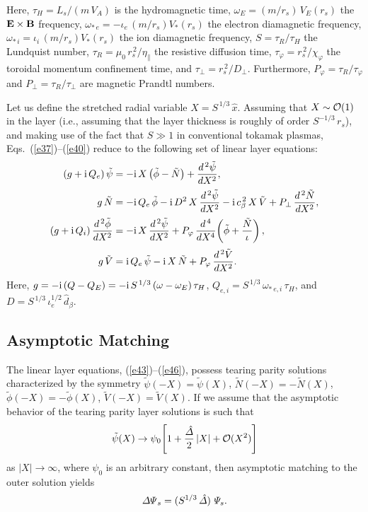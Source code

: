 \documentclass[12pt,prb,aps]{revtex4-1}
\begin{document}
Here, 
$\tau_H = L_s/(m\,V_A)$ 
is the  hydromagnetic time, 
$\omega_E =(m/r_s)\,V_E(r_s)$
  the 
 ${\bf E}\times {\bf B}$ frequency, 
$\omega_{\ast\,e} = -\iota_e\,(m/r_s)V_\ast(r_s)$
the 
   electron diamagnetic
frequency,
$\omega_{\ast\,i} =\iota_i\,(m/r_s)V_\ast(r_s)$
 the  ion diamagnetic
frequency, 
$S=\tau_R/\tau_H$
 the  Lundquist number, 
$\tau_R = \mu_0\,r_s^{\,2}/\eta_\parallel$
 the
 resistive diffusion time, 
$\tau_\varphi
= r_s^{\,2}/\chi_\varphi$
the  toroidal momentum confinement time, and 
$\tau_\perp = r_s^{\,2}/D_\perp$.
  Furthermore, $P_\varphi = \tau_R/\tau_\varphi$ and $P_\perp = \tau_R/\tau_\perp$ are magnetic Prandtl numbers.

 Let us define the stretched radial variable $X = S^{\,1/3}\,\hat{x}$.
Assuming that $X\sim{\cal O}(1)$ in the layer (i.e., assuming that the layer thickness is roughly of order $S^{-1/3}\,r_s$),
and making use of the fact that $S\gg 1$ in conventional tokamak plasmas,  Eqs.~(\ref{e37})--(\ref{e40}) reduce to the following
set of linear layer equations:\,\cite{cole}
\begin{align}\label{e43}
(g+{\rm i}\,Q_e)\,\tilde{\psi}&= - {\rm i}\,X\left(\tilde{\phi}-\tilde{N}\right)+ \frac{d^{\,2}\tilde{\psi}}{d X^2},\\[0.5ex]
g\,\tilde{N} &= - {\rm i}\,Q_{e}\,\tilde{\phi}   - {\rm i} \,D^{2}\,X\,\frac{d^{\,2}\tilde{\psi}}{dX^{2}}- {\rm i}\,c_\beta^{\,2}\,X\,\tilde{V}
+ P_\perp\,\frac{d^{\,2} \tilde{N}}{dX^{2}},\\[0.5ex]
(g+{\rm i}\,Q_i)\,\frac{d^{\,2}\tilde{\phi}}{dX^2}&= - {\rm i}\,X\,\frac{d^{\,2}\tilde{\psi}}{dX^2}+ P_\varphi\,\frac{d^{\,4}}{dX^4}\!\left(\tilde{\phi} + \frac{\tilde{N}}{\iota}\right),\\[0.5ex]
g\,\tilde{V} &= {\rm i}\,Q_{e}\,\tilde{\psi} - {\rm i}\,X\,\tilde{N} + P_\varphi\,\frac{d^{\,2}\tilde{V}}{dX^{2}}.\label{e46}
\end{align}
Here, $g = -{\rm i}\,(Q-Q_E)=-{\rm i}\,S^{\,1/3}\,(\omega-\omega_E)\,\tau_H$, $Q_{e,i} = S^{\,1/3}\,\omega_{\ast\,e,i}\,\tau_H$,
and $D = S^{\,1/3}\,\iota_e^{1/2}\,\hat{d}_\beta$. 

\subsection{Asymptotic Matching}
The  linear layer equations, (\ref{e43})--(\ref{e46}), possess tearing parity solutions
characterized by the symmetry $\tilde{\psi}(-X)=\tilde\psi(X)$, 
$\tilde{N}(-X)= - \tilde{N}(X)$, $\tilde{\phi}(-X)=-\tilde{\phi}(X)$,  $\tilde{V}(-X)=\tilde{V}(X)$. If we assume that
the asymptotic behavior of the tearing parity layer solutions is such that 
\begin{equation}\label{e47}
\tilde{\psi}(X)\rightarrow  \psi_0\!\left[1+ \frac{\hat{\mit\Delta}}{2}\,|X| + {\cal O}(X^2)\right]
\end{equation}
as $|X|\rightarrow\infty$, where $\psi_0$ is an arbitrary constant, then asymptotic matching to the outer solution yields
\begin{equation}\label{e48}
{\mit\Delta\Psi}_s= (S^{1/3}\,\hat{\mit\Delta})\,\,{\mit\Psi}_s.
\end{equation}
\end{document}
